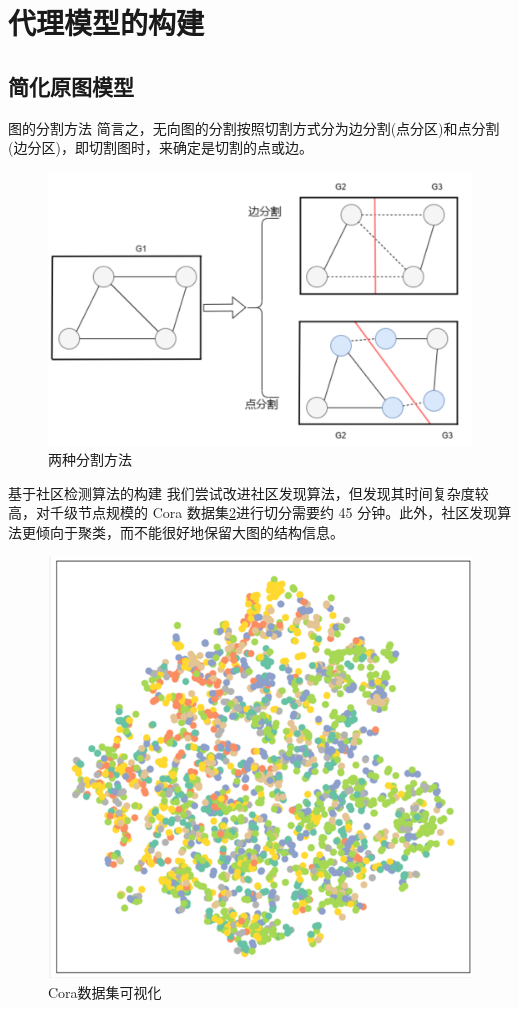 \documentclass[UTF8, aspectratio=169,10pt]{beamer}%
\numberwithin{equation}{section}
\numberwithin{figure}{section}
\numberwithin{table}{section}
\theoremstyle{definition}
\begin{document}
\section{代理模型的构建}
\subsection{简化原图模型}

\begin{frame}{图的分割方法}
	 简言之，无向图的分割按照切割方式分为边分割(点分区)和点分割(边分区)，即切割图时，来确定是切割的点或边。
	 \begin{figure}[htpb]
	 	\centering
	 	\includegraphics[width=0.5\linewidth]{pic1/a1}
	 	\caption{两种分割方法}
	 	\label{fig:4a}
	 \end{figure}
	
\end{frame}



\begin{frame}{基于社区检测算法的构建}
	我们尝试改进社区发现算法，但发现其时间复杂度较高，对千级节点规模的 Cora 数据集\cref{fig:4}进行切分需要约 45 分钟。此外，社区发现算法更倾向于聚类，而不能很好地保留大图的结构信息。
	\begin{figure}[htpb]
		\centering
		\includegraphics[width=0.33\linewidth]{fig/w3}
		\caption{Cora数据集可视化}
		\label{fig:4}
	\end{figure}
	
	
\end{frame}
\end{document}
